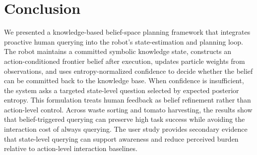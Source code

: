 \section{Conclusion}
\label{sec:conclusion}

We presented a knowledge-based belief-space planning framework that integrates proactive human querying into the robot's state-estimation and planning loop. The robot maintains a committed symbolic knowledge state, constructs an action-conditioned frontier belief after execution, updates particle weights from observations, and uses entropy-normalized confidence to decide whether the belief can be committed back to the knowledge base. When confidence is insufficient, the system asks a targeted state-level question selected by expected posterior entropy. This formulation treats human feedback as belief refinement rather than action-level control. Across waste sorting and tomato harvesting, the results show that belief-triggered querying can preserve high task success while avoiding the interaction cost of always querying. The user study provides secondary evidence that state-level querying can support awareness and reduce perceived burden relative to action-level interaction baselines.
